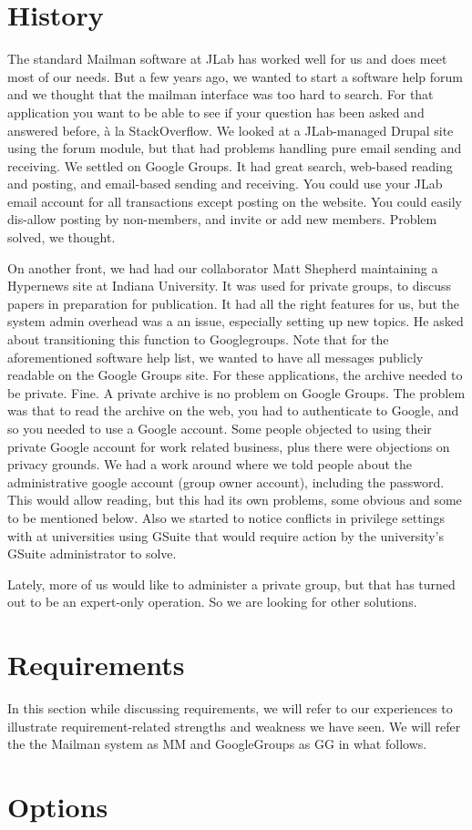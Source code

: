 \documentclass{article}
\begin{document}
\section{History}

The standard Mailman software at JLab has worked well for us and does
meet most of our needs. But a few years ago, we wanted to start a
software help forum and we thought that the mailman interface was too
hard to search. For that application you want to be able to see if
your question has been asked and answered before, \` a la StackOverflow. We looked at a
JLab-managed Drupal site using the forum module, but that had problems
handling pure email sending and receiving. We settled on Google
Groups. It had great search, web-based reading and posting, and
email-based sending and receiving. You could use your JLab email
account for all transactions except posting on the website. You could
easily dis-allow posting by non-members, and invite or add new
members. Problem solved, we thought.

On another front, we had had our collaborator Matt Shepherd
maintaining a Hypernews site at Indiana University. It was used for
private groups, to discuss papers in preparation for publication. It
had all the right features for us, but the system admin overhead was a
an issue, especially setting up new topics. He asked about
transitioning this function to Googlegroups. Note that for the
aforementioned software help list, we wanted to have all messages
publicly readable on the Google Groups site. For these applications,
the archive needed to be private. Fine. A private archive is no
problem on Google Groups. The problem was that to read the archive on
the web, you had to authenticate to Google, and so you needed to use a
Google account. Some people objected to using their private Google
account for work related business, plus there were objections on
privacy grounds. We had a work around where we told people about the
administrative google account (group owner account), including the
password. This would allow reading, but this had its own problems,
some obvious and some to be mentioned below. Also we started to notice
conflicts in privilege settings with at universities using GSuite that
would require action by the university's GSuite administrator to
solve.

Lately, more of us would like to administer a private group, but that
has turned out to be an expert-only operation. So we are looking for
other solutions.

\section{Requirements}

In this section while discussing requirements, we will refer to our
experiences to illustrate requirement-related strengths and weakness
we have seen. We will refer the the Mailman system as MM and
GoogleGroups as GG in what follows.




\section{Options}
\end{document}
